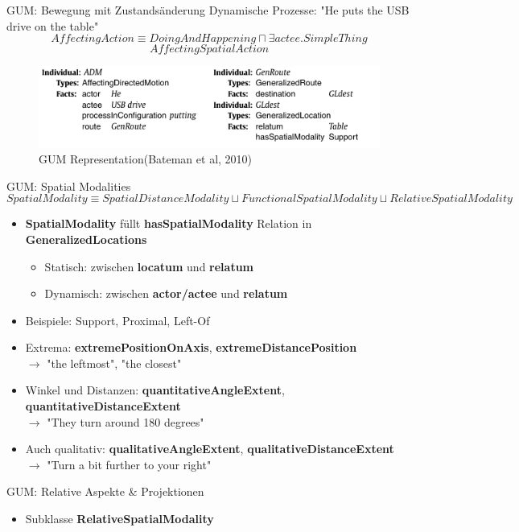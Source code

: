 \documentclass[12pt,a4paper]{beamer}
\begin{document}
\begin{frame}{GUM: Bewegung mit Zustandsänderung}
Dynamische Prozesse: "He puts the USB drive on the table"
$$AffectingAction \equiv DoingAndHappening \sqcap \exists actee.SimpleThing$$
$$AffectingSpatialAction$$
\begin{figure}
\includegraphics[scale=0.45]{img/2010_puts_usb_on_table.png}
\caption{GUM Representation(Bateman et al, 2010)}
\end{figure}
\end{frame}

\begin{frame}{GUM: Spatial Modalities}
$$  SpatialModality \equiv SpatialDistanceModality \sqcup FunctionalSpatialModality \sqcup RelativeSpatialModality $$
\begin{itemize}
\item \textbf{SpatialModality} füllt \textbf{hasSpatialModality} Relation in \textbf{GeneralizedLocations}
\begin{itemize}
    \item Statisch: zwischen \textbf{locatum} und \textbf{relatum}
    \item Dynamisch: zwischen \textbf{actor/actee} und \textbf{relatum}
\end{itemize}
\item Beispiele: Support, Proximal, Left-Of
\item Extrema: \textbf{extremePositionOnAxis}, \textbf{extremeDistancePosition} \\
$\to$ "the leftmost", "the closest"
\item Winkel und Distanzen: \textbf{quantitativeAngleExtent}, \textbf{quantitativeDistanceExtent} \\
$\to$ "They turn around 180 degrees"
\item Auch qualitativ: \textbf{qualitativeAngleExtent}, \textbf{qualitativeDistanceExtent} \\
$\to$ "Turn a bit further to your right"
\end{itemize}
\end{frame}


\begin{frame}{GUM: Relative Aspekte \& Projektionen}
\begin{itemize}
\item Subklasse \textbf{RelativeSpatialModality}
\end{itemize}
\end{frame}
\end{document}
